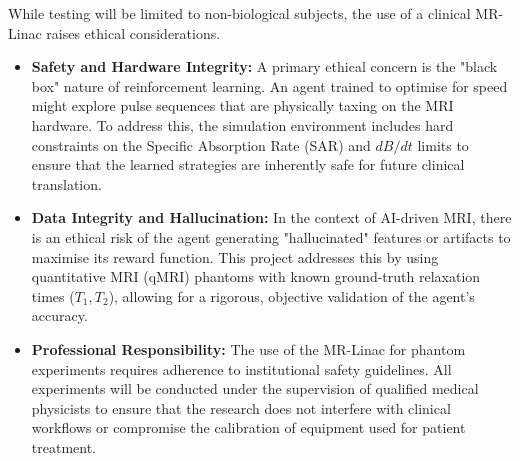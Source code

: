While testing will be limited to non-biological subjects, the use of a clinical MR-Linac raises ethical considerations.

\begin{itemize}
    \item \textbf{Safety and Hardware Integrity:} A primary ethical concern is the "black box" nature of reinforcement learning. An agent trained to optimise for speed might explore pulse sequences that are physically taxing on the MRI hardware. To address this, the simulation environment includes hard constraints on the Specific Absorption Rate (SAR) and $dB/dt$ limits to ensure that the learned strategies are inherently safe for future clinical translation.
    \item \textbf{Data Integrity and Hallucination:} In the context of AI-driven MRI, there is an ethical risk of the agent generating "hallucinated" features or artifacts to maximise its reward function. This project addresses this by using quantitative MRI (qMRI) phantoms with known ground-truth relaxation times ($T_1, T_2$), allowing for a rigorous, objective validation of the agent's accuracy.
    \item \textbf{Professional Responsibility:} The use of the MR-Linac for phantom experiments requires adherence to institutional safety guidelines. All experiments will be conducted under the supervision of qualified medical physicists to ensure that the research does not interfere with clinical workflows or compromise the calibration of equipment used for patient treatment.
\end{itemize}








